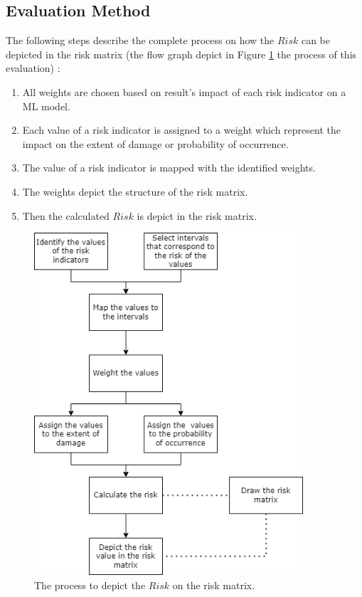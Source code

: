 \subsection{Evaluation Method}

The following steps describe the complete process on how the $Risk$ can be depicted in the risk matrix (the flow graph depict in Figure \ref{fig:flow_graph} the process of this evaluation) \cite{DBLP:journals/corr/abs-2012-04884}:

\begin{enumerate}
  \item All weights are chosen based on result's impact of each risk indicator on a ML model.
  \item Each value of a risk indicator is assigned to a weight which represent the impact on the extent of damage or probability of occurrence.
  \item The value of a risk indicator is mapped with the identified weights.
  \item The weights depict the structure of the risk matrix.
  \item Then the calculated $Risk$ is depict in the risk matrix.
\end{enumerate}

\begin{figure}[h!]
  \centering
  \includegraphics[width=10cm]{pictures/flow_graph.png}
  \caption{The process to depict the $Risk$ on the risk matrix.}
  \label{fig:flow_graph}
\end{figure}

